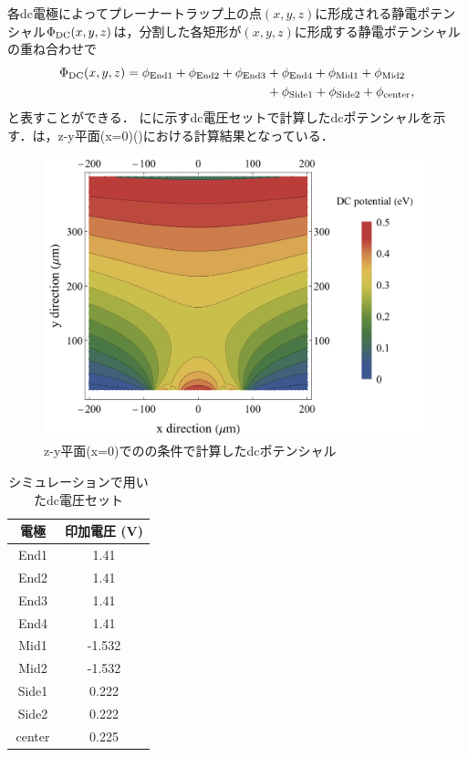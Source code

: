 各dc電極によってプレーナートラップ上の点$(x,y,z)$に形成される静電ポテンシャル$\Phi_{\rm DC}(x,y,z)$は，分割した各矩形が$(x,y,z)$に形成する静電ポテンシャルの重ね合わせで
\large
\begin{align}
	\Phi_{\rm DC}(x,y,z) = \phi_{\rm End1} + \phi_{\rm End2} + \phi_{\rm End3} &+ \phi_{\rm End4} + \phi_{\rm Mid1} + \phi_{\rm Mid2} \notag \\
	&+ \phi_{\rm Side1} + \phi_{\rm Side2} + \phi_{\rm center},
\end{align}
\normalsize
と表すことができる．
%
\clearpage
%
にに示すdc電圧セットで計算したdcポテンシャルを示す．は，z-y平面(x=0)()における計算結果となっている．
\begin{figure}[h]
			\begin{center}
				\includegraphics[width = 0.45\linewidth]{./simulation/figure/dc_potential_example.png}
					\caption{z-y平面(x=0)でのの条件で計算したdcポテンシャル}
					\label{fig:dc_potential}
			\end{center}
\end{figure}
\small
\begin{table}[h]
			\begin{center}
				\caption{シミュレーションで用いたdc電圧セット}
				\label{tab:dc_set1}
				\begin{tabular}{c|c} \hline \hline
					電極　& 印加電圧 (V) \\ \hline
					End1 & 1.41 \\ \hline
					End2 & 1.41 \\ \hline
					End3 & 1.41 \\ \hline
					End4 & 1.41 \\ \hline
					Mid1 & -1.532 \\ \hline
					Mid2 & -1.532 \\ \hline
					Side1 & 0.222 \\ \hline
					Side2 & 0.222 \\ \hline
					center & 0.225 \\ \hline
				\end{tabular}
			\end{center}
\end{table}
